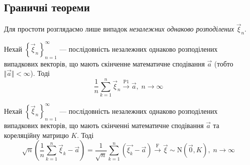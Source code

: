 \subsection{Граничні теореми}
Для простоти розглядаємо лише випадок \emph{незалежних однаково розподілених} $\vec{\xi}_n$.
\begin{theorem*}
    Нехай $\left\{ \vec{\xi}_n\right\}_{n=1}^{\infty}$ --- послідовність незалежних однаково розподілених випадкових векторів, що мають скінченне
    математичне сподівання $\vec{a}$ (тобто $\Vert \vec{a} \Vert < \infty$). Тоді 
    $$
    \frac{1}{n} \sum\limits_{k=1}^n \vec{\xi}_n \overset{\mathrm{P1}}{\longrightarrow} \vec{a}, \; n \to \infty
    $$
\end{theorem*}
\begin{theorem*}
    Нехай $\left\{ \vec{\xi}_n\right\}_{n=1}^{\infty}$ --- послідовність незалежних однаково розподілених випадкових векторів, що мають скінченні
    математичне сподівання $\vec{a}$ та кореляційну матрицю $K$. Тоді
    $$
    \sqrt{n}\left( \frac{1}{n} \sum\limits_{k=1}^n \vec{\xi}_k - \vec{a}\right) = 
    \frac{1}{\sqrt{n}} \sum\limits_{k=1}^n \left( \vec{\xi_k} - \vec{a}\right) \overset{\mathrm{F}}{\longrightarrow} \vec{\xi} \sim \mathrm{N}\left(\vec{0}, K\right), \; n\to\infty
    $$
\end{theorem*}